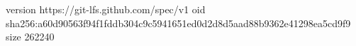 version https://git-lfs.github.com/spec/v1
oid sha256:a60d90563f94f1fddb304c9c5941651ed0d2d8d5aad88b9362e41298ea5cd9f9
size 262240
